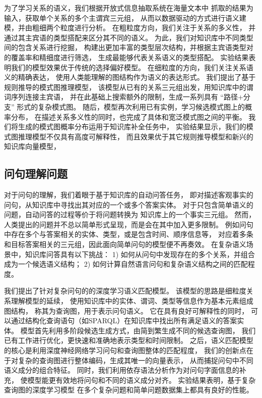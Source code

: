 为了学习关系的语义，我们根据开放式信息抽取系统在海量文本中
抓取的结果为输入，获取单个关系的多个主谓宾三元组，
从而以数据驱动的方式进行语义建模，并由粗细两个粒度进行分析。
在粗粒度方向，我们关注于关系的多义性，
并通过其主宾语的类型搭配来区分其不同的语义。
为此，我们对知识库中不同类型间的包含关系进行挖掘，
构建出更加丰富的类型层次结构，并根据主宾语类型对的覆盖率和精细度进行筛选，
生成最能够代表关系语义的类型搭配。
实验结果表明我们的模型效果优于传统的选择偏好模型。
在细粒度的方向，我们关注关系语义的精确表达，
使用人类能理解的图结构作为语义的表达形式。
我们提出了基于规则推导的模式图推理模型，
该模型从已有的关系三元组出发，用知识库中的谓词序列连接主宾语，
并在此基础上搜索额外的限制，生成一系列具有 ``{路径+分支}'' 形式的复杂模式图。
随后，模型再次利用已有实例，学习候选模式图上的概率分布，
在描述关系多义性的同时，也完成了具体和宽泛模式图之间的平衡。
我们将生成的模式图概率分布运用于知识库补全任务中，
实验结果显示，我们的模式图推理模型不仅具有高度可解释性，
而且效果优于其它规则推导模型和新兴的知识库向量模型，

\subsection{问句理解问题}

对于问句的理解，我们着眼于基于知识库的自动问答任务，
即对描述客观事实的问句，从知识库中寻找出其对应的一个或多个答案实体。
对于只包含简单语义的问题，自动问答的过程等价于将问题转换为
知识库上的一个事实三元组。
然而，人类提出的问题并不总以简单形式呈现，而是会在其中加入更多限制。
例如问句中存在多个与答案相关的实体、类型，或是包含时间、顺序信息等，
对应着多条和目标答案相关的三元组，因此面向简单问句的模型便不再奏效。
在复杂语义场景中，知识库问答具有以下挑战：
1) 如何从问句中发现存在的多个关系，并组合成为一个候选语义结构；
2) 如何计算自然语言问句和复杂语义结构之间的匹配程度。

我们提出了针对复杂问句的的深度学习语义匹配模型。
该模型的思路是细粒度关系理解模型的延续，
使用知识库中的实体、谓词、类型等信息作为基本元素组成图结构，
称其为查询图，用于表示问句语义。
它在具有良好可解释性的同时，
可以通过结构化查询语句（如SPARQL）在知识库中找出所有满足语义的答案实体。
模型首先利用多阶段候选生成方式，由简到繁生成不同的候选查询图，
我们已有工作进行优化，更快速和准确地表示类型和时间限制。
之后，语义匹配模型的核心是利用深度神经网络学习问句和查询图整体的匹配程度，
我们的创新点在于对复杂的查询图进行整体编码，生成其唯一的向量表示，
从而捕捉问句中不同语义成分的组合特征。
同时，我们利用依存语法分析作为对问句字面信息的补充，
使模型能更有效地将问句和不同的语义成分对齐。
实验结果表明，基于复杂查询图的深度学习模型
在多个复杂问题和简单问题数据集上都具有良好的性能。




